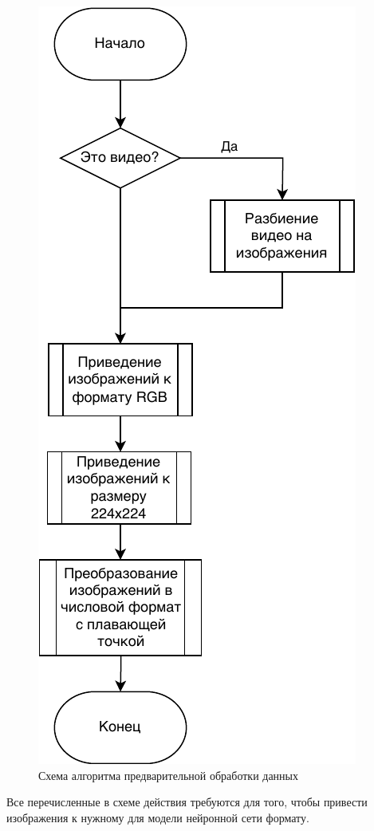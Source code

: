 \begin{figure}[hbtp]
	\centering
	\includegraphics[scale=1]{img/prep_data.pdf}
	\caption{Схема алгоритма предварительной обработки данных}
	\label{fig:prep_data}
\end{figure}

Все перечисленные в схеме действия требуются для того, чтобы привести изображения к нужному для модели нейронной сети формату.

